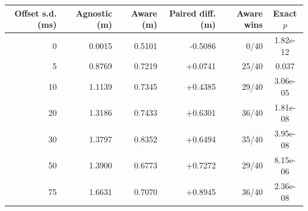 \begin{tabular}{rrrrrc}
\toprule
Offset s.d. (ms) & Agnostic (m) & Aware (m) & Paired diff. (m) & Aware wins & Exact $p$ \\
\midrule
0 & 0.0015 & 0.5101 & -0.5086 & 0/40 & 1.82e-12 \\
5 & 0.8769 & 0.7219 & +0.0741 & 25/40 & 0.037 \\
10 & 1.1139 & 0.7345 & +0.4385 & 29/40 & 3.06e-05 \\
20 & 1.3186 & 0.7433 & +0.6301 & 36/40 & 1.81e-08 \\
30 & 1.3797 & 0.8352 & +0.6494 & 35/40 & 3.95e-08 \\
50 & 1.3900 & 0.6773 & +0.7272 & 29/40 & 8.15e-06 \\
75 & 1.6631 & 0.7070 & +0.8945 & 36/40 & 2.36e-08 \\
\bottomrule
\end{tabular}
